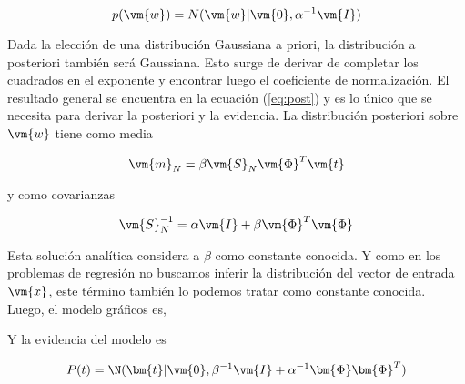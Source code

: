 \documentclass[a4paper,10pt]{article}
\begin{document}
\begin{equation}
 p(\vm{w}) = N(\vm{w}| \vm{0}, \alpha^{-1} \vm{I})
\end{equation}

Dada la elecci\'on de una distribuci\'on Gaussiana a priori, la distribuci\'on a posteriori tambi\'en ser\'a Gaussiana.
Esto surge de derivar de completar los cuadrados en el exponente y encontrar luego el coeficiente de normalizaci\'on.
El resultado general se encuentra en la ecuaci\'on (\ref{eq:post}) y es lo \'unico que se necesita para derivar la posteriori y la evidencia.
La distribuci\'on posteriori sobre $\vm{w}$ tiene como media

\begin{equation}
 \vm{m}_N = \beta  \vm{S}_N\vm{\Phi}^T \vm{t}
\end{equation}

y como covarianzas

\begin{equation}
 \vm{S}_N^{-1} = \alpha \vm{I} + \beta \vm{\Phi}^T\vm{\Phi}
\end{equation}

Esta soluci\'on anal\'itica considera a $\beta$ como constante conocida.
Y como en los problemas de regresi\'on no buscamos inferir la distribuci\'on del vector de entrada $\vm{x}$, este t\'ermino tambi\'en lo podemos tratar como constante conocida.
Luego, el modelo gr\'aficos es, 

\begin{figure}[H]
    \centering
\end{figure}

Y la evidencia del modelo es

\begin{equation}
 P(t) = \N(\bm{t}| \vm{0}, \beta^{-1} \vm{I} + \alpha^{-1}\bm{\Phi}\bm{\Phi}^T  )
\end{equation}
\end{document}
